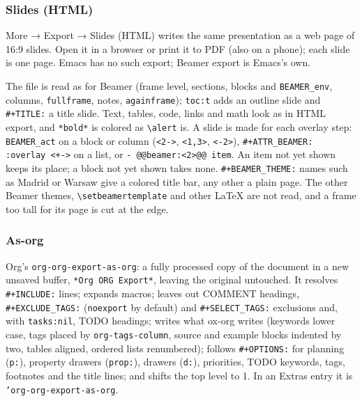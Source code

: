 \documentclass[11pt]{article}
\begin{document}
\subsubsection{Slides (HTML)}
\label{sec:org2f0be52}

More → Export → Slides (HTML) writes the same presentation as a web page of 16:9 slides. Open it in a browser or print it to PDF (also on a phone); each slide is one page. Emacs has no such export; Beamer export is Emacs's own.

The file is read as for Beamer (frame level, sections, blocks and \texttt{BEAMER\_env}, columns, \texttt{fullframe}, notes, \texttt{againframe}); \texttt{toc:t} adds an outline slide and \texttt{\#+TITLE:} a title slide. Text, tables, code, links and math look as in HTML export, and \texttt{*bold*} is colored as \texttt{\textbackslash{}alert} is. A slide is made for each overlay step: \texttt{BEAMER\_act} on a block or column (\texttt{<2->}, \texttt{<1,3>}, \texttt{<-2>}), \texttt{\#+ATTR\_BEAMER: :overlay <+->} on a list, or \texttt{- @@beamer:<2>@@ item}. An item not yet shown keeps its place; a block not yet shown takes none. \texttt{\#+BEAMER\_THEME:} names such as Madrid or Warsaw give a colored title bar, any other a plain page. The other Beamer themes, \texttt{\textbackslash{}setbeamertemplate} and other \LaTeX{} are not read, and a frame too tall for its page is cut at the edge.

\subsubsection{As-org}
\label{sec:org235e311}

Org's \texttt{org-org-export-as-org}: a fully processed copy of the document in a new unsaved buffer, \texttt{*Org ORG Export*}, leaving the original untouched. It resolves \texttt{\#+INCLUDE:} lines; expands macros; leaves out COMMENT headings, \texttt{\#+EXCLUDE\_TAGS:} (\texttt{noexport} by default) and \texttt{\#+SELECT\_TAGS:} exclusions and, with \texttt{tasks:nil}, TODO headings; writes what ox-org writes (keywords lower case, tags placed by \texttt{org-tags-column}, source and example blocks indented by two, tables aligned, ordered lists renumbered); follows \texttt{\#+OPTIONS:} for planning (\texttt{p:}), property drawers (\texttt{prop:}), drawers (\texttt{d:}), priorities, TODO keywords, tags, footnotes and the title lines; and shifts the top level to 1. In an Extras entry it is \texttt{'org-org-export-as-org}.
\end{document}
